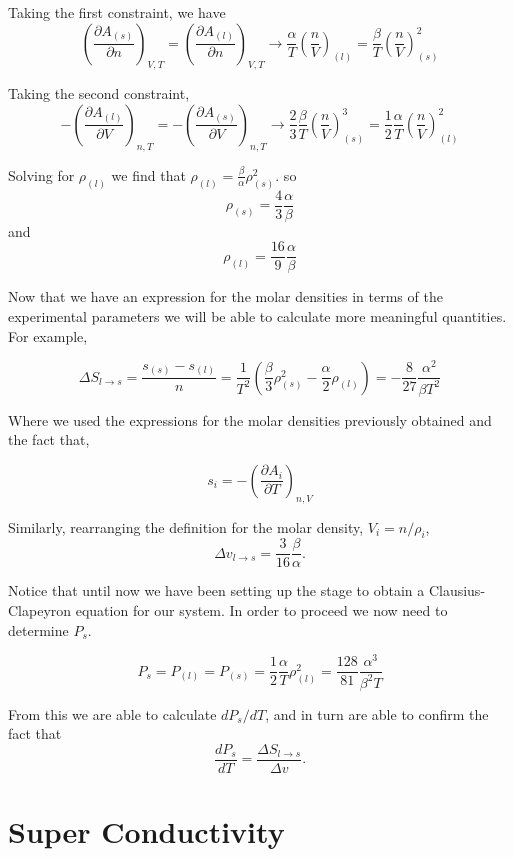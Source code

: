 \documentclass[10pt,twoside,openright]{memoir}
\begin{document}
Taking the first constraint, we have
$$
\left( \frac{\partial A_{(s)}}{\partial n} \right)_{V,T} = \left( \frac{\partial A_{(l)}}{\partial n} \right)_{V,T} \rightarrow \frac{\alpha}{T}\left(\frac{n}{V}\right)_{(l)} = \frac{\beta}{T} \left( \frac{n}{V} \right)_{(s)}^{2}
$$

Taking the second constraint,
$$
- \left(  \frac{\partial A_{(l)}}{\partial V}\right)_{n,T} = - \left(  \frac{\partial A_{(s)}}{\partial V}\right)_{n,T}
\rightarrow \frac{2}{3}\frac{\beta}{T} \left( \frac{n}{V} \right)_{(s)}^{3} = \frac{1}{2}\frac{\alpha}{T} \left( \frac{n}{V}  \right)_{(l)}^{2}
$$

Solving for $\rho_{(l)}$ we find that $\rho_{(l)} = \frac{\beta}{\alpha} \rho_{(s)}^{2}$. so 
\begin{equation}
\rho_{(s)} = \frac{4}{3}\frac{\alpha}{\beta}
\end{equation}
and
\begin{equation}
\rho_{(l)} = \frac{16}{9}\frac{\alpha}{\beta}
\end{equation}

Now that we have an expression for the molar densities in terms of the experimental parameters we will be able to calculate more meaningful quantities. For example,

$$
\Delta S_{l \rightarrow s} = \frac{s_{(s)} - s_{(l)}}{n} = \frac{1}{T^2}\left( \frac{\beta}{3} \rho_{(s)}^{2} - \frac{\alpha}{2} \rho_{(l)} \right) = -\frac{8}{27} \frac{\alpha ^2}{\beta T^2}
$$

Where we used the expressions for the molar densities previously obtained and the fact that,

$$ s_i = -\left( \frac{\partial A_i}{\partial T} \right)_{n,V} $$

Similarly, rearranging the definition for the molar density, $V_i = n/ \rho_i$,
$$
\Delta v_{l \rightarrow s} = \frac{3}{16}\frac{\beta}{\alpha}.
$$

Notice that until now we have been setting up the stage to obtain a Clausius-Clapeyron equation for our system. In order to proceed we now need to determine $P_s$.

$$
P_s = P_{(l)} = P_{(s)} = \frac{1}{2}\frac{\alpha}{T} \rho_{(l)}^{2} = \frac{128}{81}\frac{\alpha^3}{\beta^2 T}
$$

From this we are able to calculate $dP_s / dT$, and in turn are able to confirm the fact that 
$$ \frac{dP_s}{dT} = \frac{\Delta S_{l \rightarrow s}}{\Delta v}. $$

\chapter{Super Conductivity}
\end{document}
